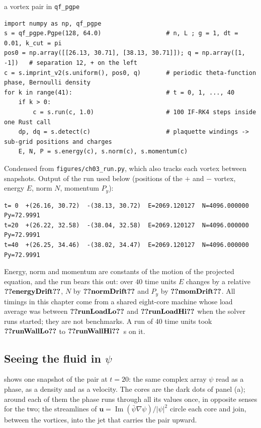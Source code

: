 \begin{rustbox}{a vortex pair in \texttt{qf\_pgpe}}
\begin{lstlisting}[style=py,basicstyle=\ttfamily\footnotesize]
import numpy as np, qf_pgpe
s = qf_pgpe.Pgpe(128, 64.0)                  # n, L ; g = 1, dt = 0.01, k_cut = pi
pos0 = np.array([[26.13, 30.71], [38.13, 30.71]]); q = np.array([1, -1])   # separation 12, + on the left
c = s.imprint_v2(s.uniform(), pos0, q)       # periodic theta-function phase, Bernoulli density
for k in range(41):                          # t = 0, 1, ..., 40
    if k > 0:
        c = s.run(c, 1.0)                    # 100 IF-RK4 steps inside one Rust call
    dp, dq = s.detect(c)                     # plaquette windings -> sub-grid positions and charges
    E, N, P = s.energy(c), s.norm(c), s.momentum(c)
\end{lstlisting}
\smallskip\footnotesize
Condensed from \texttt{figures/ch03\_run.py}, which also tracks each vortex between snapshots. Output of the run used below (positions of the $+$ and $-$ vortex, energy $E$, norm $N$, momentum $P_y$):
\begin{lstlisting}[style=plainmono,basicstyle=\ttfamily\footnotesize]
t= 0  +(26.16, 30.72)  -(38.13, 30.72)  E=2069.120127  N=4096.000000  Py=72.9991
t=20  +(26.22, 32.58)  -(38.04, 32.58)  E=2069.120127  N=4096.000000  Py=72.9991
t=40  +(26.25, 34.46)  -(38.02, 34.47)  E=2069.120127  N=4096.000000  Py=72.9991
\end{lstlisting}
\end{rustbox}

Energy, norm and momentum are constants of the motion of the projected equation, and the run bears this out: over $40$ time units $E$ changes by a relative $\cthreeNum{energyDrift}$, $N$ by $\cthreeNum{normDrift}$ and $P_y$ by $\cthreeNum{momDrift}$. All timings in this chapter come from a shared eight-core machine whose load average was between $\cthreeNum{runLoadLo}$ and $\cthreeNum{runLoadHi}$ when the solver runs started; they are not benchmarks. A run of 40 time units took $\cthreeNum{runWallLo}$ to $\cthreeNum{runWallHi}$~s on it.

\subsection{Seeing the fluid in \texorpdfstring{$\psi$}{psi}}\label{ch03:see}

 shows one snapshot of the pair at $t=20$: the same complex array $\psi$ read as a phase, as a density and as a velocity. The cores are the dark dots of panel (a); around each of them the phase runs through all its values once, in opposite senses for the two; the streamlines of $\mathbf u=\operatorname{Im}(\bar\psi\nabla\psi)/|\psi|^2$ circle each core and join, between the vortices, into the jet that carries the pair upward.

